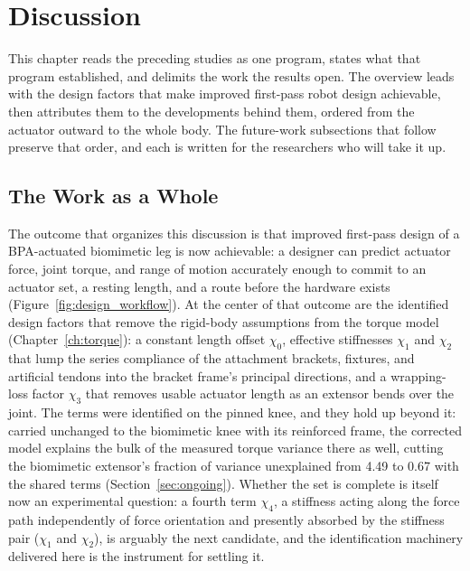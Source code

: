 \chapter{Discussion}\label{ch:overall}\label{ch:futurework}
\graphicspath{{D:/Github/Bipedal_Robot/Documentation/Reports and Papers/Dissertation/Figures/70-overall/}{figs/70-overall/}}

This chapter reads the preceding studies as one program, states what that program established, and delimits the work the results open. The overview leads with the design factors that make improved first-pass robot design achievable, then attributes them to the developments behind them, ordered from the actuator outward to the whole body. The future-work subsections that follow preserve that order, and each is written for the researchers who will take it up.

\section{The Work as a Whole}\label{sec:foundation}

The outcome that organizes this discussion is that improved first-pass design of a BPA-actuated biomimetic leg is now achievable: a designer can predict actuator force, joint torque, and range of motion accurately enough to commit to an actuator set, a resting length, and a route before the hardware exists (Figure~\ref{fig:design_workflow}). At the center of that outcome are the identified design factors that remove the rigid-body assumptions from the torque model (Chapter~\ref{ch:torque}): a constant length offset $\chi_{0}$, effective stiffnesses $\chi_{1}$ and $\chi_{2}$ that lump the series compliance of the attachment brackets, fixtures, and artificial tendons into the bracket frame's principal directions, and a wrapping-loss factor $\chi_{3}$ that removes usable actuator length as an extensor bends over the joint. The terms were identified on the pinned knee, and they hold up beyond it: carried unchanged to the biomimetic knee with its reinforced frame, the corrected model explains the bulk of the measured torque variance there as well, cutting the biomimetic extensor's fraction of variance unexplained from 4.49 to 0.67 with the shared terms (Section~\ref{sec:ongoing}). Whether the set is complete is itself now an experimental question: a fourth term $\chi_{4}$, a stiffness acting along the force path independently of force orientation and presently absorbed by the stiffness pair ($\chi_{1}$ and $\chi_{2}$), is arguably the next candidate, and the identification machinery delivered here is the instrument for settling it.

